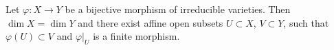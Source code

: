 Let $\varphi: X \rightarrow Y$ be a bijective morphism of irreducible varieties. Then $\dim X = \dim Y$ and there exist affine open subsets $U \subset X$, $V \subset Y$, such that $\varphi(U) \subset V$ and $\varphi|_U$ is a finite morphism.
